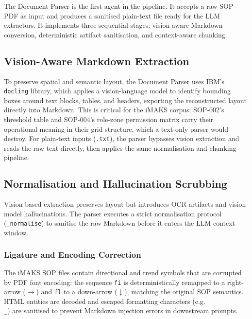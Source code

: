 ﻿\documentclass[11pt]{article}
\begin{document}
The Document Parser is the first agent in the
pipeline. It accepts a raw SOP PDF as input and produces a sanitised plain-text
file ready for the LLM extractors. It implements three sequential stages: vision-aware
Markdown conversion, deterministic artifact sanitisation, and context-aware chunking.

\subsection{Vision-Aware Markdown Extraction}
To preserve spatial and semantic layout, the Document Parser uses IBM's
\texttt{docling} library, which applies a vision-language model to identify
bounding boxes around text blocks, tables, and headers, exporting the
reconstructed layout directly into Markdown. This is critical for the iMAKS
corpus: SOP-002's threshold table and SOP-004's role-zone permission matrix
carry their operational meaning in their grid structure, which a text-only parser
would destroy. For plain-text inputs (\texttt{.txt}), the parser bypasses vision
extraction and reads the raw text directly, then applies the same normalisation
and chunking pipeline.

\subsection{Normalisation and Hallucination Scrubbing}
Vision-based extraction preserves layout but introduces OCR artifacts and
vision-model hallucinations. The parser executes a strict normalisation protocol
(\texttt{\_normalise}) to sanitise the raw Markdown before it enters the LLM
context window.

\subsubsection{Ligature and Encoding Correction}
The iMAKS SOP files contain directional and trend symbols that are corrupted by
PDF font encoding: the sequence \texttt{fi} is deterministically remapped to a
right-arrow ($\rightarrow$) and \texttt{fl} to a down-arrow ($\downarrow$),
matching the original SOP semantics. HTML entities are decoded and escaped
formatting characters (e.g.\ \texttt{\\\_}) are sanitised to prevent Markdown
injection errors in downstream prompts.
\end{document}
